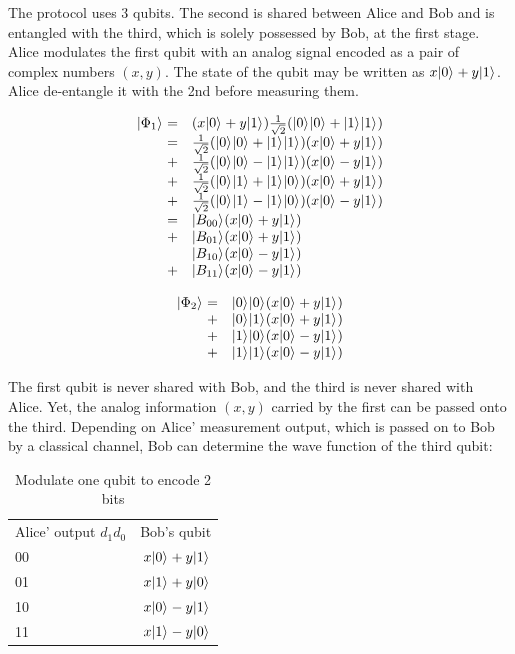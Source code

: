 \documentclass[oneside, letter, 12pt]{book}
\begin{document}
The protocol uses 3 qubits. The second is shared between Alice and Bob and is entangled with the third, which is solely possessed by Bob, at the first stage. Alice modulates the first qubit with an analog signal encoded as a pair of complex numbers $(x, y)$. The state of the qubit may be written as $x \vert {0} \rangle_{} + y\vert {1} \rangle_{}$. Alice de-entangle it with the 2nd before measuring them.

\begin{equation}
\begin{array}{rl}
\vert {\Phi_1} \rangle_{}
    = & (x \vert {0} \rangle_{} + y\vert {1} \rangle_{}) \frac 1 {\sqrt 2}(\vert {0} \rangle_{}\vert {0} \rangle_{}+\vert {1} \rangle_{}\vert {1} \rangle_{}) \\
    = & \frac 1 {\sqrt 2} (\vert {0} \rangle_{}\vert {0} \rangle_{}+\vert {1} \rangle_{}\vert {1} \rangle_{}) (x \vert {0} \rangle_{} + y\vert {1} \rangle_{}) \\
    +& \frac 1 {\sqrt 2} (\vert {0} \rangle_{}\vert {0} \rangle_{}-\vert {1} \rangle_{}\vert {1} \rangle_{}) (x \vert {0} \rangle_{} - y\vert {1} \rangle_{})  \\
    +& \frac 1 {\sqrt 2} (\vert {0} \rangle_{}\vert {1} \rangle_{}+\vert {1} \rangle_{}\vert {0} \rangle_{}) (x \vert {0} \rangle_{} + y\vert {1} \rangle_{}) \\
    +& \frac 1 {\sqrt 2} (\vert {0} \rangle_{}\vert {1} \rangle_{}-\vert {1} \rangle_{}\vert {0} \rangle_{}) (x \vert {0} \rangle_{} - y\vert {1} \rangle_{}) \\
    = & \vert {B_{00}} \rangle_{} (x \vert {0} \rangle_{} + y\vert {1} \rangle_{}) \\
    +& \vert {B_{01}} \rangle_{} (x \vert {0} \rangle_{} + y\vert {1} \rangle_{}) \\
    & \vert {B_{10}} \rangle_{} (x \vert {0} \rangle_{} - y\vert {1} \rangle_{}) \\
    +& \vert {B_{11}} \rangle_{} (x \vert {0} \rangle_{} - y\vert {1} \rangle_{})
\end{array}
\end{equation}

\begin{equation}
\begin{array}{rl}
\vert {\Phi_2} \rangle_{}
    = & \vert {0} \rangle_{} \vert {0} \rangle_{} (x \vert {0} \rangle_{} + y\vert {1} \rangle_{}) \\
    +& \vert {0} \rangle_{} \vert {1} \rangle_{} (x \vert {0} \rangle_{} + y\vert {1} \rangle_{}) \\
    + & \vert {1} \rangle_{} \vert {0} \rangle_{}  (x \vert {0} \rangle_{} - y\vert {1} \rangle_{}) \\
    +& \vert {1} \rangle_{} \vert {1} \rangle_{} (x \vert {0} \rangle_{} - y\vert {1} \rangle_{})
\end{array}
\end{equation}

The first qubit is never shared with Bob, and the third is never shared with Alice. Yet, the analog information $(x, y)$ carried by the first can be passed onto the third. Depending on Alice' measurement output, which is passed on to Bob by a classical channel, Bob can determine the wave function of the third qubit:
\begin{table}[]
\label{TeleportationTable}
\begin{tabular}{lr}
Alice' output $d_1 d_0$ & Bob's qubit  \\
00 & $x\vert {0} \rangle_{}+y\vert {1} \rangle_{}$ \\
01 & $x\vert {1} \rangle_{}+y\vert {0} \rangle_{}$ \\
10 & $x\vert {0} \rangle_{}-y\vert {1} \rangle_{}$  \\
11 & $x\vert {1} \rangle_{}-y\vert {0} \rangle_{}$ 
\end{tabular}
\caption{Modulate one qubit to encode 2 bits}
\end{table}
\end{document}

